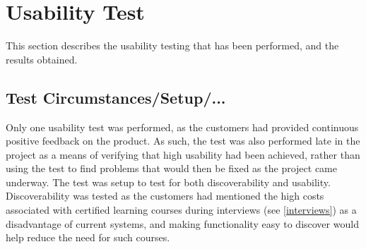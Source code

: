 \section{Usability Test}
This section describes the usability testing that has been performed, and the results obtained. 

\subsection{Test Circumstances/Setup/...}
Only one usability test was performed, as the customers had provided continuous positive feedback on the product. 
As such, the test was also performed late in the project as a means of verifying that high usability had been achieved, rather than using the test to find problems that would then be fixed as the project came underway. \newline
The test was setup to test for both discoverability and usability. 
Discoverability was tested as the customers had mentioned the high costs associated with certified learning courses during interviews (see \autoref{interviews}) as a disadvantage of current systems, and making functionality easy to discover would help reduce the need for such courses. 
